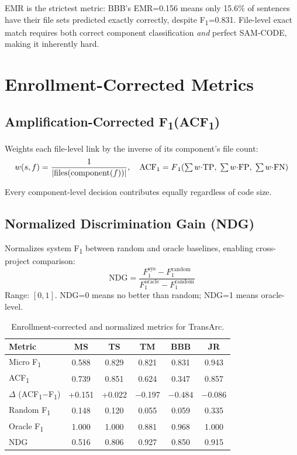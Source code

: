 \documentclass[11pt,a4paper]{report}
\newcommand{\samcode}{SAM-CODE\xspace}
\newcommand{\transarc}{TransArc\xspace}
\newcommand{\fone}{F\textsubscript{1}\xspace}
\newcommand{\acfone}{ACF\textsubscript{1}\xspace}
\begin{document}
EMR is the strictest metric: BBB's EMR=0.156 means only 15.6\% of sentences
have their file sets predicted exactly correctly, despite \fone=0.831. File-level
exact match requires both correct component classification \emph{and} perfect
\samcode, making it inherently hard.


\section{Enrollment-Corrected Metrics}
\label{sec:eval:corrected}

\subsection{Amplification-Corrected \fone (\acfone)}

Weights each file-level link by the inverse of its component's file count:
\[
w(s, f) = \frac{1}{|\text{files}(\text{component}(f))|}, \quad
\text{ACF}_1 = \fone\!\left(\textstyle\sum w{\cdot}\text{TP},\;
\sum w{\cdot}\text{FP},\; \sum w{\cdot}\text{FN}\right)
\]

Every component-level decision contributes equally regardless of code size.

\subsection{Normalized Discrimination Gain (NDG)}

Normalizes system \fone between random and oracle baselines, enabling cross-project
comparison:
\[
\text{NDG} = \frac{F_1^{\text{sys}} - F_1^{\text{random}}}
{F_1^{\text{oracle}} - F_1^{\text{random}}}
\]
Range: $[0,1]$. NDG=0 means no better than random; NDG=1 means oracle-level.

\begin{table}[h]
\caption{Enrollment-corrected and normalized metrics for \transarc.}
\label{tab:corrected}
\centering\small
\begin{tabular}{lccccc}
\toprule
\textbf{Metric} & \textbf{MS} & \textbf{TS} & \textbf{TM} & \textbf{BBB} & \textbf{JR} \\
\midrule
Micro \fone     & 0.588 & 0.829 & 0.821 & 0.831 & 0.943 \\
\acfone         & 0.739 & 0.851 & 0.624 & 0.347 & 0.857 \\
$\Delta$ (ACF\textsubscript{1}$-$\fone) & +0.151 & +0.022 & $-$0.197 & $-$0.484 & $-$0.086 \\
\midrule
Random \fone    & 0.148 & 0.120 & 0.055 & 0.059 & 0.335 \\
Oracle \fone    & 1.000 & 1.000 & 0.881 & 0.968 & 1.000 \\
NDG             & 0.516 & 0.806 & 0.927 & 0.850 & 0.915 \\
\bottomrule
\end{tabular}
\end{table}
\end{document}
